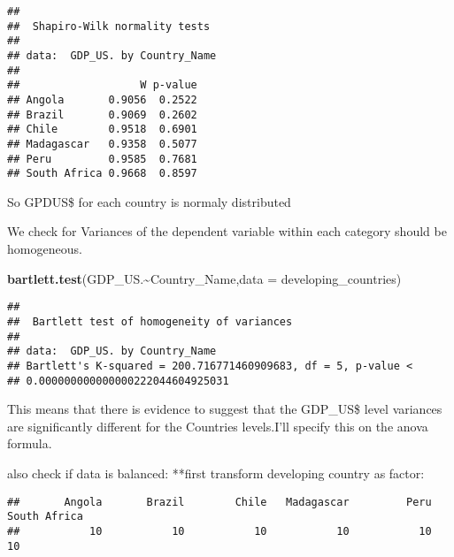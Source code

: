 \documentclass[
]{article}
\newenvironment{Shaded}{\begin{snugshade}}{\end{snugshade}}
\newcommand{\AttributeTok}[1]{\textcolor[rgb]{0.13,0.29,0.53}{#1}}
\newcommand{\FunctionTok}[1]{\textcolor[rgb]{0.13,0.29,0.53}{\textbf{#1}}}
\newcommand{\NormalTok}[1]{#1}
\newcommand{\OtherTok}[1]{\textcolor[rgb]{0.56,0.35,0.01}{#1}}
\newcommand{\SpecialCharTok}[1]{\textcolor[rgb]{0.81,0.36,0.00}{\textbf{#1}}}
\begin{document}
\begin{verbatim}
## 
##  Shapiro-Wilk normality tests
## 
## data:  GDP_US. by Country_Name 
## 
##                   W p-value
## Angola       0.9056  0.2522
## Brazil       0.9069  0.2602
## Chile        0.9518  0.6901
## Madagascar   0.9358  0.5077
## Peru         0.9585  0.7681
## South Africa 0.9668  0.8597
\end{verbatim}

So GPDUS\$ for each country is normaly distributed

We check for Variances of the dependent variable within each category
should be homogeneous.

\begin{Shaded}
\begin{Highlighting}[]
\FunctionTok{bartlett.test}\NormalTok{(GDP\_US.}\SpecialCharTok{\textasciitilde{}}\NormalTok{Country\_Name,}\AttributeTok{data =}\NormalTok{ developing\_countries)}
\end{Highlighting}
\end{Shaded}

\begin{verbatim}
## 
##  Bartlett test of homogeneity of variances
## 
## data:  GDP_US. by Country_Name
## Bartlett's K-squared = 200.716771460909683, df = 5, p-value <
## 0.000000000000000222044604925031
\end{verbatim}

This means that there is evidence to suggest that the GDP\_US\$ level
variances are significantly different for the Countries levels.I'll
specify this on the anova formula.

also check if data is balanced: **first transform developing country as
factor:

\begin{Shaded}
\end{Shaded}

\begin{verbatim}
##       Angola       Brazil        Chile   Madagascar         Peru South Africa 
##           10           10           10           10           10           10
\end{verbatim}
\end{document}
